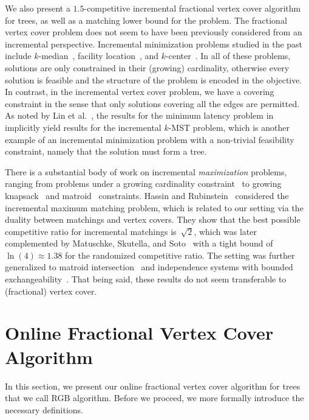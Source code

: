 \documentclass[a4paper,USenglish,cleveref,autoref,thm-restate,pdfa]{lipics-v2021}
\begin{document}
We also present a $1.5$-competitive incremental fractional vertex cover algorithm for trees, as well as a matching lower bound for the problem.
The fractional vertex cover problem does not seem to have been previously considered from an incremental perspective.
Incremental minimization problems studied in the past include $k$-median~\cite{ChrobakKenyonNogaYoung08,MettuPlaxton03,LinNagarajanRajaramanWilliamson10}, facility location~\cite{Plaxton06,LinNagarajanRajaramanWilliamson10}, and $k$-center~\cite{Gonzalez85}.
In all of these problems, solutions are only constrained in their (growing) cardinality, otherwise every solution is feasible and the structure of the problem is encoded in the objective. 
In contrast, in the incremental vertex cover problem, we have a covering constraint in the sense that only solutions covering all the edges are permitted.
As noted by Lin et al.~\cite{LinNagarajanRajaramanWilliamson10}, the results for the minimum latency problem in~\cite{BlumChalasaniCoppersmithEtAl94,GoemansKleinberg98} implicitly yield results for the incremental $k$-MST problem, which is another example of an incremental minimization problem with a non-trivial feasibility constraint, namely that the solution must form a tree.

There is a substantial body of work on incremental \emph{maximization} problems, ranging from problems under a growing cardinality constraint~\cite{BernsteinDisserGrossHimburg22,DisserKlimmSchewiorWeckbecker23,DisserWeckbecker25} to growing knapsack~\cite{MegowMestre13,DisserKlimmMegowStiller17,DisserKlimmLutzWeckbecker24} and matroid~\cite{FujitaKobayashiMakino13,KakimuraMakino13} constraints.
Hassin and Rubinstein~\cite{HassinRubinstein02} considered the incremental maximum matching problem, which is related to our setting via the duality between matchings and vertex covers.
They show that the best possible competitive ratio for incremental matchings is~$\sqrt{2}$, which was later complemented by Matuschke, Skutella, and Soto~\cite{MatuschkeSkutellaSoto18} with a tight bound of $\ln(4) \approx 1.38$ for the randomized competitive ratio.
The setting was further generalized to matroid intersection~\cite{FujitaKobayashiMakino13} and independence systems with bounded exchangeability~\cite{KakimuraMakino13}.
That being said, these results do not seem transferable to (fractional) vertex cover. 

\section{Online Fractional Vertex Cover Algorithm}
In this section, we present our online fractional vertex cover algorithm for trees that we call RGB algorithm. Before we proceed, we more formally introduce the necessary definitions.
\end{document}
